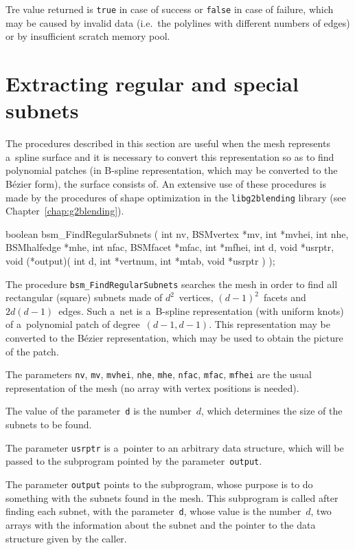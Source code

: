 Tre value returned is \texttt{true} in case of success or \texttt{false} in
case of failure, which may be caused by invalid data (i.e.\ the polylines
with different numbers of edges) or by insufficient scratch memory pool.

\section{Extracting regular and special subnets}

The procedures described in this section are useful when the mesh represents
a~spline surface and it is necessary to convert this representation so as to
find polynomial patches (in B-spline representation, which may be converted
to the B\'{e}zier form), the surface consists of. An extensive use of these
procedures is made by the procedures of shape optimization in the
\texttt{libg2blending} library (see Chapter~\ref{chap:g2blending}).

\medskip
\begin{listingC}
boolean bsm_FindRegularSubnets ( int nv, BSMvertex *mv, int *mvhei,
                         int nhe, BSMhalfedge *mhe,
                         int nfac, BSMfacet *mfac, int *mfhei,
                         int d, void *usrptr,
                         void (*output)( int d, int *vertnum, int *mtab,
                                         void *usrptr ) );
\end{listingC}
The procedure \texttt{bsm\_FindRegularSubnets} searches the mesh in order to
find all rectangular (square) subnets made of $d^2$~vertices,
$(d-1)^2$~facets and $2d(d-1)$~edges. Such a~net is a~B-spline
representation (with uniform knots) of a~polynomial patch of
degree~$(d-1,d-1)$. This representation may be converted to the B\'{e}zier
representation, which may be used to obtain the picture of the patch.

The parameters \texttt{nv}, \texttt{mv}, \texttt{mvhei}, \texttt{nhe},
\texttt{mhe}, \texttt{nfac}, \texttt{mfac}, \texttt{mfhei} are the usual
representation of the mesh (no array with vertex positions is needed).

The value of the parameter~\texttt{d} is the number~$d$, which determines
the size of the subnets to be found.

The parameter \texttt{usrptr} is a~pointer to an arbitrary data structure,
which will be passed to the subprogram pointed by the
parameter~\texttt{output}.

The parameter \texttt{output} points to the subprogram, whose purpose is to
do something with the subnets found in the mesh. This subprogram is called
after finding each subnet, with the parameter~\texttt{d}, whose value is the
number~$d$, two arrays with the information about the subnet and the pointer
to the data structure given by the caller.

